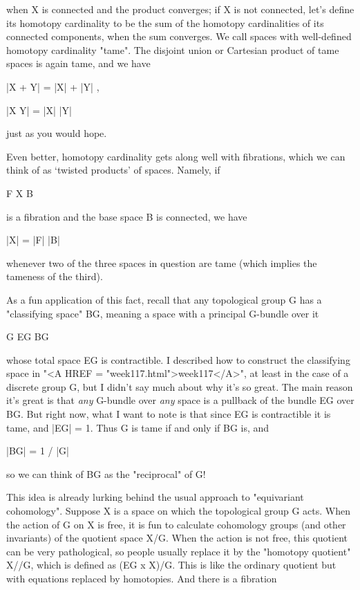 when X is connected and the product converges; if X is not connected, 
let's define its homotopy cardinality to be the sum of the homotopy 
cardinalities of its connected components, when the sum converges.  
We call spaces with well-defined homotopy cardinality "tame".  The 
disjoint union or Cartesian product of tame spaces is again tame, 
and we have  

                     |X + Y| = |X| + |Y| ,   

                     |X \times  Y| = |X| \times  |Y| 

just as you would hope.  

Even better, homotopy cardinality gets along well with fibrations,
which we can think of as `twisted products' of spaces.  Namely, if 

                        F \to  X \to  B 

is a fibration and the base space B is connected, we have

                       |X| = |F| \times  |B|  

whenever two of the three spaces in question are tame (which implies
the tameness of the third).  

As a fun application of this fact, recall that any topological group G
has a "classifying space" BG, meaning a 
space with a principal G-bundle over it

                       G \to  EG \to  BG  

whose total space EG is contractible.  I described how to construct
the classifying space in "<A HREF =
"week117.html">week117</A>", at least in the case of a discrete
group G, but I didn't say much about why it's so great.  The main
reason it's great is that \emph{any} G-bundle over \emph{any}
space is a pullback of the bundle EG over BG.  But right now, what I
want to note is that since EG is contractible it is tame, and |EG| =
1.  Thus G is tame if and only if BG is, and

                          |BG| = 1 / |G|

so we can think of BG as the "reciprocal" of G!

This idea is already lurking behind the usual approach to "equivariant 
cohomology".  Suppose X is a space on which the topological group G
acts.  When the action of G on X is free, it is fun to calculate 
cohomology groups (and other invariants) of the quotient space X/G.
When the action is not free, this quotient can be very pathological, 
so people usually replace it by the "homotopy quotient" X//G, which is
defined as (EG x X)/G.  This is like the ordinary quotient but with
equations replaced by homotopies.  And there is a fibration

